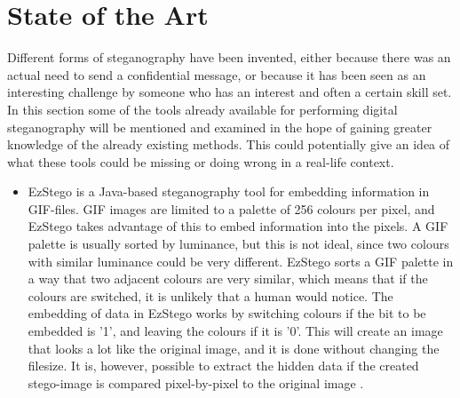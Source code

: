\section{State of the Art}
\label{sec:SOTA}
Different forms of steganography have been invented, either because there was an actual need to send a confidential message, or because it has been seen as an interesting challenge by someone who has an interest and often a certain skill set. In this section some of the tools already available for performing digital steganography will be mentioned and examined in the hope of gaining greater knowledge of the already existing methods. This could potentially give an idea of what these tools could be missing or doing wrong in a real-life context. 

\begin{itemize}
  \item EzStego is a Java-based steganography tool for embedding information in GIF-files.
  GIF images are limited to a palette of 256 colours per pixel, and EzStego takes advantage of this to embed information into the pixels.
  A GIF palette is usually sorted by luminance, but this is not ideal, since two colours with similar luminance could be very different.
  EzStego sorts a GIF palette in a way that two adjacent colours are very similar, which means that if the colours are switched, it is unlikely that a human would notice.
  The embedding of data in EzStego works by switching colours if the bit to be embedded is '1', and leaving the colours if it is '0'.
  This will create an image that looks a lot like the original image, and it is done without changing the filesize.
  It is, however, possible to extract the hidden data if the created stego-image is compared pixel-by-pixel to the original image \citep{Westfield_2000}.
	
	

\end{itemize}

